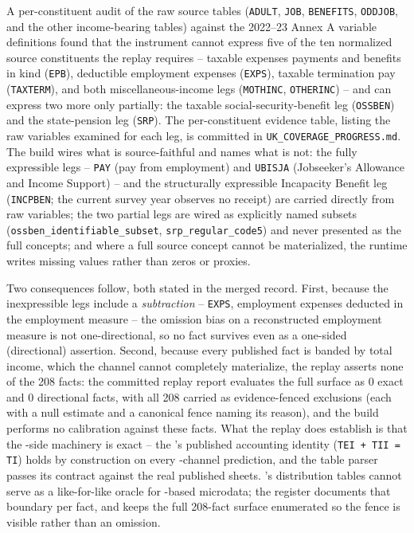 A per-constituent audit of the raw \frs{} source tables (\texttt{ADULT},
\texttt{JOB}, \texttt{BENEFITS}, \texttt{ODDJOB}, and the other
income-bearing tables) against the \spi{} 2022--23 Annex A variable
definitions found that the \frs{} instrument cannot express five of the
ten normalized \spi{} source constituents the replay requires -- taxable
expenses payments and benefits in kind (\texttt{EPB}), deductible
employment expenses (\texttt{EXPS}), taxable termination pay
(\texttt{TAXTERM}), and both miscellaneous-income legs (\texttt{MOTHINC},
\texttt{OTHERINC}) -- and can express two more only partially: the taxable
social-security-benefit leg (\texttt{OSSBEN}) and the state-pension leg
(\texttt{SRP}). The per-constituent evidence table, listing the raw \frs{}
variables examined for each leg, is committed in
\texttt{UK\_COVERAGE\_PROGRESS.md}. The build wires what is source-faithful
and names what is not: the fully expressible legs -- \texttt{PAY} (pay
from employment) and \texttt{UBISJA} (Jobseeker's Allowance and Income
Support) -- and the structurally expressible Incapacity Benefit leg
(\texttt{INCPBEN}; the current survey year observes no receipt) are
carried directly from raw \frs{} variables; the two partial legs are wired
as explicitly named subsets (\texttt{ossben\_identifiable\_subset},
\texttt{srp\_regular\_code5}) and never presented as the full \spi{}
concepts; and where a full source concept cannot be materialized, the
runtime writes missing values rather than zeros or proxies.

Two consequences follow, both stated in the merged record. First, because
the inexpressible legs include a \emph{subtraction} -- \texttt{EXPS},
employment expenses deducted in the \spi{} employment measure -- the
omission bias on a reconstructed employment measure is not
one-directional, so no fact survives even as a one-sided (directional)
assertion. Second, because every published fact is banded by total income,
which the \frs{} channel cannot completely materialize, the replay asserts
none of the 208 facts: the committed replay report evaluates the full
surface as 0 exact and 0 directional facts, with all 208 carried as
evidence-fenced exclusions (each with a null estimate and a canonical
fence naming its reason), and the build performs no calibration against
these facts. What the replay does establish is that the \spi{}-side
machinery is exact -- the \spi{}'s published accounting identity
(\texttt{TEI + TII = TI}) holds by construction on every \spi{}-channel
prediction, and the table parser passes its contract against the real
published sheets. \hmrc{}'s distribution tables cannot serve as a
like-for-like oracle for \frs{}-based microdata; the register documents
that boundary per fact, and keeps the full 208-fact surface enumerated so
the fence is visible rather than an omission.

